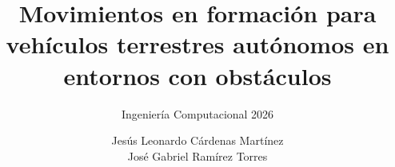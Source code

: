 \title{Movimientos en formación para vehículos terrestres autónomos en entornos con obstáculos}
\subtitle{Ingeniería Computacional 2026}
\author{Jesús Leonardo Cárdenas Martínez\\ José Gabriel Ramírez Torres}


\maketitle